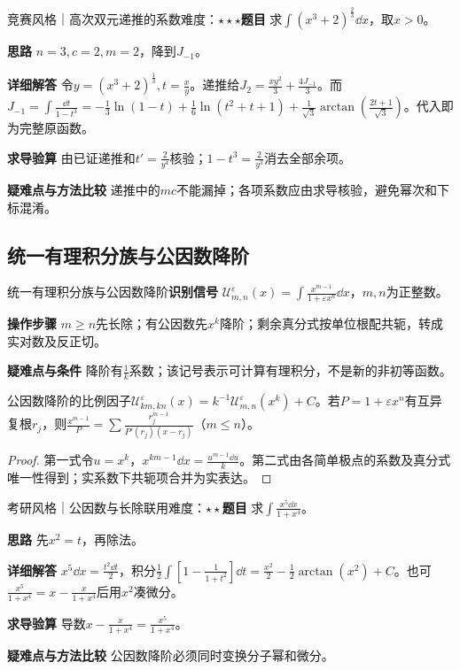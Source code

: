\begin{example}{竞赛风格｜高次双元递推的系数}{难度：$\star\star\star$}\label{ic:ex:indefinite_dual_complete:cubicrecur}\textbf{题目} 求$\int(x^3+2)^{\frac{2}{3}}\dd x$，取$x>0$。\par \textbf{思路} $n=3,c=2,m=2$，降到$J_{-1}$。\par \textbf{详细解答} 令$y=(x^3+2)^{\frac{1}{3}},t=\frac{x}{y}$。递推给$J_2=\frac{xy^2}{3}+\frac{4J_{-1}}{3}$。而$J_{-1}=\int\frac{\dd t}{1-t^3}=-\frac13\ln(1-t)+\frac16\ln(t^2+t+1)+\frac1{\sqrt3}\arctan(\frac{2t+1}{\sqrt3})$。代入即为完整原函数。\par \textbf{求导验算} 由已证递推和$t'=\frac{2}{y^4}$核验；$1-t^3=\frac{2}{y^3}$消去全部余项。\par \textbf{疑难点与方法比较} 递推中的$mc$不能漏掉；各项系数应由求导核验，避免幂次和下标混淆。\end{example}

\subsection{统一有理积分族与公因数降阶}\label{ic:indefinite_dual_complete:ufamily}\begin{method}{统一有理积分族与公因数降阶}\textbf{识别信号} $\mathcal U^\varepsilon_{m,n}(x)=\int \frac{x^{m-1}}{1+\varepsilon x^n}\dd x$，$m,n$为正整数。\par \textbf{操作步骤} $m\ge n$先长除；有公因数先$x^k$降阶；剩余真分式按单位根配共轭，转成实对数及反正切。\par \textbf{疑难点与条件} 降阶有$\frac{1}{k}$系数；该记号表示可计算有理积分，不是新的非初等函数。\end{method}

\begin{theorem}{公因数降阶的比例因子}$\mathcal U^\varepsilon_{km,kn}(x)=k^{-1}\mathcal U^\varepsilon_{m,n}(x^k)+C$。若$P=1+\varepsilon x^n$有互异复根$r_j$，则$\frac{x^{m-1}}{P}=\sum \frac{r_j^{m-1}}{P'(r_j)(x-r_j)}$（$m\le n$）。\end{theorem}\begin{proof}第一式令$u=x^k$，$x^{km-1}\dd x=\frac{u^{m-1}\dd u}{k}$。第二式由各简单极点的系数及真分式唯一性得到；实系数下共轭项合并为实表达。\end{proof}

\begin{example}{考研风格｜公因数与长除联用}{难度：$\star\star$}\label{ic:ex:indefinite_dual_complete:gcd}\textbf{题目} 求$\int \frac{x^5\dd x}{1+x^4}$。\par \textbf{思路} 先$x^2=t$，再除法。\par \textbf{详细解答} $x^5\dd x=\frac{t^2\dd t}{2}$，积分$\frac12\int[1-\frac{1}{1+t^2}]\dd t=\frac{x^2}2-\frac12\arctan(x^2)+C$。也可$\frac{x^5}{1+x^4}=x-\frac{x}{1+x^4}$后用$x^2$凑微分。\par \textbf{求导验算} 导数$x-\frac{x}{1+x^4}=\frac{x^5}{1+x^4}$。\par \textbf{疑难点与方法比较} 公因数降阶必须同时变换分子幂和微分。\end{example}

